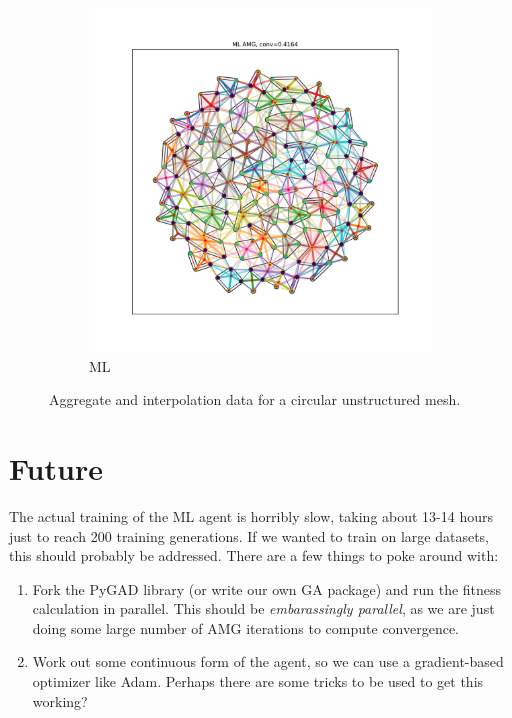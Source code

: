 \documentclass{article}
\begin{document}
\begin{figure}[h]
\begin{subfigure}[t]{0.49\textwidth}
    \includegraphics[width=\textwidth]{grid_circle_ml.pdf}
    \caption{ML}
  \end{subfigure}
  \caption{Aggregate and interpolation data for a circular unstructured mesh.}
  \label{fig:gridcircle}
\end{figure}

\section{Future}
The actual training of the ML agent is horribly slow, taking about 13-14 hours just to reach 200 training generations.  If we wanted to train on large datasets, this should probably be addressed.  There are a few things to poke around with:
\begin{enumerate}
\item Fork the PyGAD library (or write our own GA package) and run the fitness calculation in parallel.  This should be \textit{embarassingly parallel}, as we are just doing some large number of AMG iterations to compute convergence.
\item Work out some continuous form of the agent, so we can use a gradient-based optimizer like Adam.  Perhaps there are some tricks to be used to get this working?
\end{enumerate}



\end{document}
